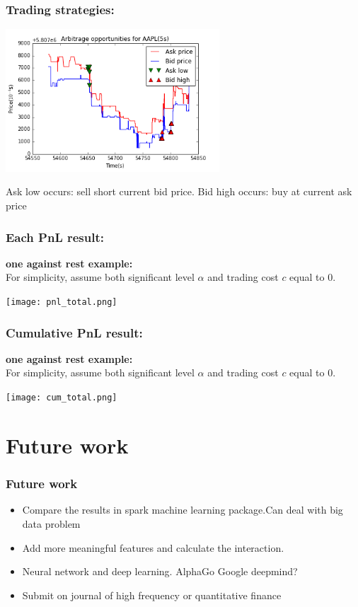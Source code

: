 \documentclass[xcolor={x11names,svgnames,dvipsnames}]{beamer}
\begin{document}
\begin{frame}
\frametitle{Trading strategies:}


\begin{center}
     \includegraphics[width=0.6\textwidth, height=0.6\textheight]{arbitrage_plot.png}
\end{center}    
Ask low occurs: sell short current bid price. Bid high occurs: buy at current ask price
\end{frame}


\begin{frame}
\frametitle{Each PnL result:}
\textbf{one against rest example:}\\
For simplicity, assume both significant level $\alpha$ and trading cost $c$ equal to 0.
\begin{center}
     \texttt{[image: pnl\_total.png]}
\end{center}    

\end{frame}

\begin{frame}
\frametitle{Cumulative PnL result:}
\textbf{one against rest example:}\\
For simplicity, assume both significant level $\alpha$ and trading cost $c$ equal to 0.
\begin{center}
     \texttt{[image: cum\_total.png]}
\end{center}    

\end{frame}



\section{Future work}
\begin{frame}
\frametitle{Future work}
    \begin{itemize}
        \item  Compare the results in spark machine learning package.Can deal with big data problem 
        \item  Add more meaningful features and calculate the interaction.
        \item  Neural network and deep learning.  AlphaGo Google deepmind?
        \item  Submit on journal of high frequency or quantitative finance 
      \end{itemize}
\end{frame}
\end{document}
